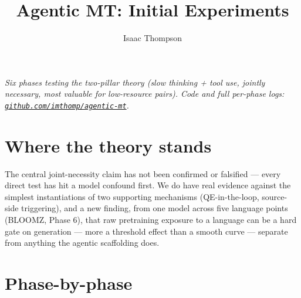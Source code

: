 \documentclass[11pt]{article}
\title{\vspace{-1em}Agentic MT: Initial Experiments}
\author{Isaac Thompson}
\date{}
\begin{document}
\maketitle
\vspace{-2em}

\noindent\textit{Six phases testing the two-pillar theory (slow thinking + tool use, jointly
necessary, most valuable for low-resource pairs). Code and full per-phase logs:
\href{https://github.com/imthomp/agentic-mt}{\texttt{github.com/imthomp/agentic-mt}}.}

\vspace{4pt}
\section*{Where the theory stands}

The central joint-necessity claim has not been confirmed or falsified --- every direct test
has hit a model confound first. We do have real evidence against the simplest instantiations
of two supporting mechanisms (QE-in-the-loop, source-side triggering), and a new finding, from one model across five language points (BLOOMZ, Phase 6), that
raw pretraining exposure to a language can be a hard gate on generation --- more a threshold
effect than a smooth curve --- separate from anything the agentic scaffolding does.

\section*{Phase-by-phase}
\end{document}
